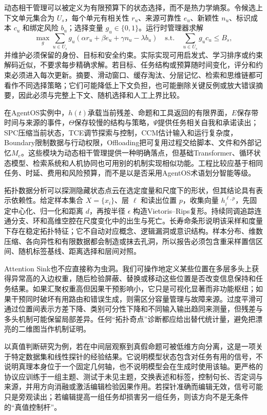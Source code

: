 \label{subsec:cognitive_thermodynamics_cct_dcm}
动态相干管理可以被定义为有限预算下的状态选择，而不是热力学熵泵。令候选上下文单元集合为 $U_s$，每个单元有相关性 $r_u$、来源可靠性 $e_u$、新颖性 $n_u$、标识成本 $c_u$ 和绑定风险 $b_u$；选择变量 $g_u\in\{0,1\}$。运行时管理器求解
\[
\max_{g}\sum_{u\in U_s}g_u
(\alpha r_u+\beta e_u+\gamma n_u-\lambda b_u)
\quad\text{s.t.}\quad
\sum_{u\in U_s}g_uc_u\le B_s,
\]
并维护必须保留的身份、目标和安全约束。实际实现可用启发式、学习排序或约束解码近似，不要求每步精确求解。若目标、任务结构或预算随时间变化，评分和约束必须进入每次更新。摘要、滑动窗口、缓存淘汰、分层记忆、检索和思维链都可看作不同选择策略；它们可能降低上下文负担，也可能删除关键反例或放大错误摘要，因此必须与完整上下文、随机选择和人工上界比较。

在AgentOS实例中，$h(t)$承载当前残差、命题和工具返回的有限界面，$E$保存带时间与来源的事件，$\Theta$保存较慢的结构与策略，$\Psi$提供任务相关自我和承诺读出；SPC压缩当前状态，TCE调节探索与控制，CCM估计输入和运行复杂度，Boundary限制数据与行动权限，Offloading把可复用过程交给脚本、文件和外部记忆$M_e$。这些模块为动态相干管理提供一种明确落点，但基础Transformer、循环状态模型、检索系统和人机协同也可用别的机制实现相似功能。工程比较应基于相同任务、时延、费用和风险预算，而不是以是否采用AgentOS术语划分智能等级。

\label{subsec:tda_manifold_lithography}
拓扑数据分析可以探测隐藏状态点云在选定度量和尺度下的形状，但其结论具有表示依赖性。给定样本集合 $X=\{x_i\}$、层 $\ell$ 和读出位置 $p$，收集向量 $h_i^{\ell,p}$，先固定中心化、归一化和距离 $d$，再按半径 $\epsilon$ 构造Vietoris--Rips复形。持续同调追踪连通分支、环和高维空腔在尺度变化中的出生与死亡。长寿命条形说明该采样和度量下存在稳定拓扑特征；它不自动对应概念、逻辑漏洞或意识结构。样本分布、维数压缩、各向异性和有限数据都会制造或抹去孔洞，所以报告必须包含重采样置信区间、随机标签基线、距离选择和层间对照。

Attention Sink也不应直接称为虫洞。我们可操作地定义某些位置在多层多头上获得异常高的入边权重，随后检验屏蔽、替换或移动这些位置是否改变信息保持和任务结果。如果汇聚权重高但因果干预影响小，它只是可视化显著而非功能枢纽；如果干预同时破坏有用路由和错误生成，则需区分容量管理与故障来源。过度平滑可通过位置间表示方差下降、类别可分性下降和不同输入输出趋同来测量，但残差与多头机制可能保留局部差异。任何“拓扑奇点”诊断都应给出替代统计量，避免把漂亮的二维图当作机制证明。

\label{subsec:tda_manifold_evolution}
以真值判断研究为例，若在中间层观察到真假命题可被低维方向分离，这是一项关于特定数据集和线性探针的经验结果。它说明模型状态包含对任务有用的信号，不说明真理本身位于一个固定几何轴，也不说明模型会在生成时使用该轴。更严格的协议应训练于一组主题、测试于未见主题，交换表述和标签，控制句长、否定词与来源，并用方向消融或激活编辑检验因果作用。若探针准确而编辑无效，信号可能只是旁观读出；若编辑提高一组任务却损害另一组任务，则该方向不是无条件的“真值控制杆”。

